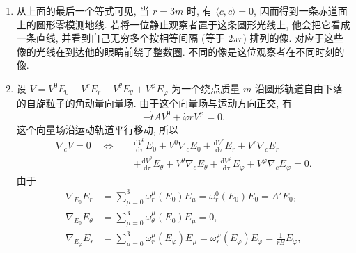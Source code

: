 \begin{description}[font=\normalfont,leftmargin=2em,labelwidth=1.5em]
\begin{enumerate}[label=(\alph*),ref=\alph*,leftmargin=*]
\[     +\ddot\varphi rE_\varphi=0,
\]
等价地,
\[
  \begin{cases}
    \ddot t=0\\
    \ddot\varphi=0\\
    \dot t^2A^2A'=\dfrac{\dot\varphi^2r}{B}
       \Longleftrightarrow AA'\dot t^2=\dot\varphi^2r
       \Longleftrightarrow \dfrac{m}{r^2}\dot t^2=\dot\varphi^2r.
  \end{cases}
\]
最后, 由于必须满足 $\langle\dot c,\dot c\rangle=-1$, 得
\begin{align*}
  -\left(1-\frac{2m}{r}\right)\dot t^2+r^2\dot\varphi^2=-1
    &\quad\Longleftrightarrow\quad
      \left(1-\frac{2m}{r}-\frac{m}{r}\right)\dot t^2=1\\
    &\quad\Longleftrightarrow\quad
      \left(1-\frac{3m}{r}\right)\dot t^2=1.
\end{align*}
\item 从上面的最后一个等式可见, 当 $r=3m$ 时, 有 $\langle\dot c,\dot c\rangle=0$, 因而得到一条赤道面上的圆形零模测地线. 若将一位静止观察者置于这条圆形光线上, 他会把它看成一条直线, 并看到自己无穷多个按相等间隔 (等于 $2\pi r$) 排列的像. 对应于这些像的光线在到达他的眼睛前绕了整数圈. 不同的像是这位观察者在不同时刻的像.
\item 设 $V=V^0E_0+V^rE_r+V^\theta E_\theta+V^\varphi E_\varphi$ 为一个绕点质量 $m$ 沿圆形轨道自由下落的自旋粒子的角动量向量场. 由于这个向量场与运动方向正交, 有
\begin{equation}\label{eq:schwarzschild-spin-orthogonal-to-orbit}
  -\dot t AV^0+\dot\varphi rV^\varphi=0.
\end{equation}
这个向量场沿运动轨道平行移动, 所以
\begin{align*}
  \nabla_{\dot c}V=0\quad\Longleftrightarrow\quad
   &\frac{\mathrm{d}V^0}{\mathrm{d}\tau}E_0+V^0\nabla_{\dot c}E_0
     +\frac{\mathrm{d}V^r}{\mathrm{d}\tau}E_r+V^r\nabla_{\dot c}E_r\\
   &+\frac{\mathrm{d}V^\theta}{\mathrm{d}\tau}E_\theta+V^\theta\nabla_{\dot c}E_\theta
     +\frac{\mathrm{d}V^\varphi}{\mathrm{d}\tau}E_\varphi+V^\varphi\nabla_{\dot c}E_\varphi=0.
\end{align*}
由于
\begin{align*}
  \nabla_{E_0}E_r&=\sum_{\mu=0}^3\omega_r^\mu(E_0)E_\mu=\omega_r^0(E_0)E_0=A'E_0,\\
  \nabla_{E_0}E_\theta&=\sum_{\mu=0}^3\omega_\theta^\mu(E_0)E_\mu=0,\\
  \nabla_{E_\varphi}E_r&=\sum_{\mu=0}^3\omega_r^\mu(E_\varphi)E_\mu
       =\omega_r^\varphi(E_\varphi)E_\varphi=\frac{1}{rB}E_\varphi,\\

\end{align*}
\end{enumerate}
\end{description}
